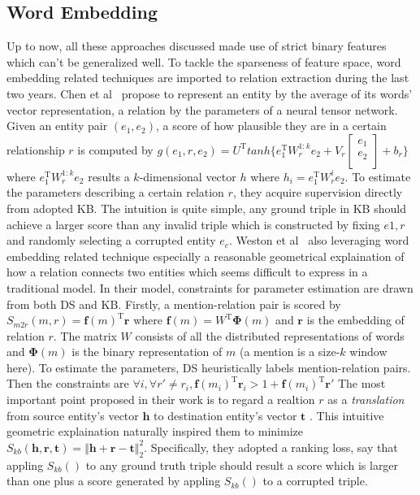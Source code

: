 \documentclass[10pt]{article} %
\theoremstyle{definition}
\theoremstyle{definition}
\begin{document}
\subsection{Word Embedding}
Up to now, all these approaches discussed made use of strict binary features which can't be generalized well. 
To tackle the sparseness of feature space, word embedding related techniques are imported to relation extraction during the last two years. 
Chen et al~\cite{cdq} propose to represent an entity by the average of its words' vector representation, a relation by the parameters of a neural tensor network. 
Given an entity pair $(e_1, e_2)$, a score of how plausible they are in a certain relationship $r$ is computed by 
$g(e_1, r, e_2)=U^{\mathrm{T}}tanh\{e_{1}^{\mathrm{T}}W_{r}^{1:k}e_2+V_{r}\begin{bmatrix}e_1\\e_2\\\end{bmatrix}+b_{r}\}$ where 
$e_{1}^{\mathrm{T}}W_{r}^{1:k}e_{2}$ results a $k$-dimensional vector $h$ where 
$h_{i}=e_{1}^{\mathrm{T}}W_{r}^{i}e_2$. 
To estimate the parameters describing a certain relation $r$, they acquire supervision directly from adopted KB. 
The intuition is quite simple, any ground triple in KB should achieve a larger score than any invalid triple which 
is constructed by fixing $e1, r$ and randomly selecting a corrupted entity $e_c$. 
Weston et al~\cite{embedding} also leveraging word embedding related technique especially a reasonable geometrical explaination of how a relation connects two entities
which seems difficult to express in a traditional model. 
In their model, constraints for parameter estimation are drawn from both DS and KB. 
Firstly, a mention-relation pair is scored by $S_{m2r}(m, r)=\mathbf{f}(m)^{\mathrm{T}}\mathbf{r}$ where 
$\mathbf{f}(m)=W^{\mathrm{T}}\boldsymbol{\Phi}(m)$ and $\mathbf{r}$ is the embedding of relation $r$. 
The matrix $W$ consists of all the distributed representations of words and $\boldsymbol{\Phi}(m)$ is 
the binary representation of $m$ (a mention is a size-$k$ window here). 
To estimate the parameters, DS heuristically labels mention-relation pairs. 
Then the constraints are $\forall i, \forall r'\neq r_i, \mathbf{f}(m_i)^{\mathrm{T}}\mathbf{r}_i > 1+\mathbf{f}(m_i)^{\mathrm{T}}\mathbf{r}'$
The most important point proposed in their work is to regard a realtion $r$ as a \emph{translation} from source entity's vector $\mathbf{h}$ to destination entity's vector $\mathbf{t}$ .
This intuitive geometric explaination naturally inspired them to minimize 
$S_{kb}(\mathbf{h},\mathbf{r},\mathbf{t})=\Vert \mathbf{h}+\mathbf{r}-\mathbf{t} \Vert_{2}^{2}$. 
Specifically, they adopted a ranking loss, say that appling $S_{kb}()$ to any ground truth triple should result a score 
which is larger than one plus a score generated by appling $S_{kb}()$ to a corrupted triple. 
\end{document}
